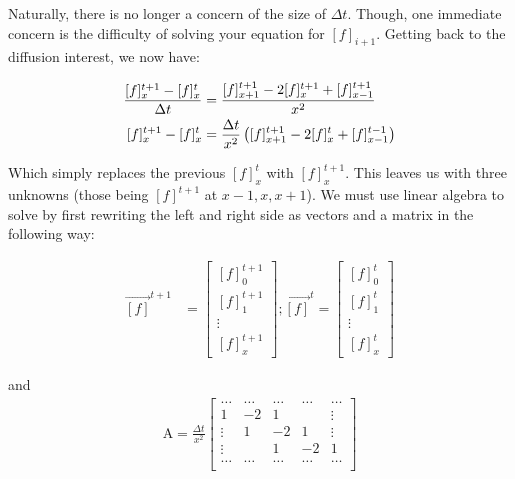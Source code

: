 Naturally, there is no longer a concern of the size of $\Delta t$. Though, one immediate concern is the difficulty of solving your equation for $[f]_{i+1}$. Getting back to the diffusion interest, we now have:

\begin{equation} \label{diff6}
\begin{split}
\frac{[f]^{t+1}_{x} - [f]^{t}_{x}}{\Delta t} &= \frac{[f]^{t+1}_{x+1} - 2[f]^{t+1}_x + [f]^{t+1}_{x - 1}}{x^2}\\
[f]^{t+1}_{x} - [f]^{t}_{x} &= \frac{\Delta t}{x^2} \left([f]^{t+1}_{x+1} - 2[f]^{t}_x + [f]^{t-1}_{x - 1}\right) \\
\end{split}
\end{equation}


Which simply replaces the previous $[f]^{t}_{x}$ with $[f]^{t+1}_{x}$. This leaves us with three unknowns (those being $[f]^{t+1}$ at $x-1,x,x+1$). We must use linear algebra to solve by first rewriting the left and right side as vectors and a matrix in the following way: 

\begin{align}
\vec{[f]}^{t+1} &= \begin{bmatrix}
        [f]^{t+1}_{0} \\
        [f]^{t+1}_{1} \\
        \vdots \\
        [f]^{t+1}_{x}
\end{bmatrix}
; \vec{[f]}^{t} = \begin{bmatrix}
        [f]^{t}_{0} \\
        [f]^{t}_{1} \\
        \vdots \\
        [f]^{t}_{x}
\end{bmatrix}
\end{align}

and 
\begin{align}
\mathrm{A} = \frac{\Delta t}{x^2}
\begin{bmatrix} %
\dots       &   \dots       & \dots     &   \dots    &   \dots   \\
1           &   -2          & 1         &            &   \vdots    \\
\vdots      &   1           & -2        &   1        &   \vdots   \\   
\vdots      &               & 1         &   -2       &   1    \\
\dots       &   \dots       & \dots     &   \dots    &   \dots    \\
\end{bmatrix}
\end{align}

